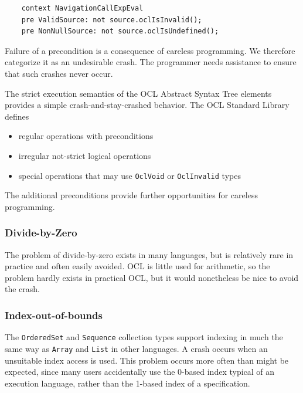 \documentclass[
]{ceurart}
\begin{document}
\begin{verbatim}
    context NavigationCallExpEval
    pre ValidSource: not source.oclIsInvalid();
    pre NonNullSource: not source.oclIsUndefined();
\end{verbatim}

Failure of a precondition is a consequence of careless programming. We therefore categorize it as an undesirable crash. The programmer needs assistance to ensure that such crashes never occur.

The strict execution semantics of the OCL Abstract Syntax Tree elements provides a simple crash-and-stay-crashed behavior. The OCL Standard Library defines

\begin{itemize}
	\item regular operations with preconditions
	\item irregular not-strict logical operations
	\item special operations that may use \verb|OclVoid| or \verb|OclInvalid| types
\end{itemize}

The additional preconditions provide further opportunities for careless programming.


\subsubsection{Divide-by-Zero}

The problem of divide-by-zero exists in many languages, but is relatively rare in practice and often easily avoided. OCL is little used for arithmetic, so the problem hardly exists in practical OCL, but it would nonetheless be nice to avoid the crash.

\subsubsection{Index-out-of-bounds}

The \verb|OrderedSet| and \verb|Sequence| collection types support indexing in much the same way as \verb|Array| and \verb|List| in other languages. A crash occurs when an unsuitable index access is used. This problem occurs more often than might be expected, since many users accidentally use the 0-based index typical of an execution language, rather than the 1-based index of a specification.
\end{document}
